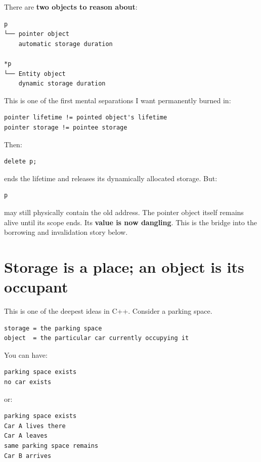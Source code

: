 There are \textbf{two objects to reason about}:

\begin{verbatim}
p
└── pointer object
    automatic storage duration

*p
└── Entity object
    dynamic storage duration
\end{verbatim}

This is one of the first mental separations I want permanently burned in:

\begin{verbatim}
pointer lifetime != pointed object's lifetime
pointer storage != pointee storage
\end{verbatim}

Then:

\begin{verbatim}
delete p;
\end{verbatim}

ends the  lifetime and releases its dynamically allocated storage. But:

\begin{verbatim}
p
\end{verbatim}

may still physically contain the old address. The pointer object itself remains alive until its scope ends. Its \textbf{value is now dangling}. This is the bridge into the borrowing and invalidation story below.

\section{Storage is a place; an object is its occupant}\label{05-engine-i-ch002-storage-is-a-place-an-object-is-its-occupant}

\hypertarget{05-engine-i-ch002-storage-is-a-place-an-object-is-its-occupant}{}

This is one of the deepest ideas in C++. Consider a parking space.

\begin{verbatim}
storage = the parking space
object  = the particular car currently occupying it
\end{verbatim}

You can have:

\begin{verbatim}
parking space exists
no car exists
\end{verbatim}

or:

\begin{verbatim}
parking space exists
Car A lives there
Car A leaves
same parking space remains
Car B arrives
\end{verbatim}

